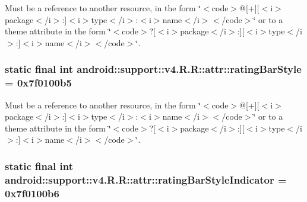 Must be a reference to another resource, in the form \char`\"{}$<$code$>$@\mbox{[}+\mbox{]}\mbox{[}$<$i$>$package$<$/i$>$:\mbox{]}$<$i$>$type$<$/i$>$:$<$i$>$name$<$/i$>$$<$/code$>$\char`\"{} or to a theme attribute in the form \char`\"{}$<$code$>$?\mbox{[}$<$i$>$package$<$/i$>$:\mbox{]}\mbox{[}$<$i$>$type$<$/i$>$:\mbox{]}$<$i$>$name$<$/i$>$$<$/code$>$\char`\"{}. \hypertarget{classandroid_1_1support_1_1v4_1_1_r_1_1attr_386384daeadc0061ae532dcde951e29c}{
\subsubsection[{ratingBarStyle}]{\setlength{\rightskip}{0pt plus 5cm}static final int android::support::v4.R.R::attr::ratingBarStyle = 0x7f0100b5}}
\label{classandroid_1_1support_1_1v4_1_1_r_1_1attr_386384daeadc0061ae532dcde951e29c}


Must be a reference to another resource, in the form \char`\"{}$<$code$>$@\mbox{[}+\mbox{]}\mbox{[}$<$i$>$package$<$/i$>$:\mbox{]}$<$i$>$type$<$/i$>$:$<$i$>$name$<$/i$>$$<$/code$>$\char`\"{} or to a theme attribute in the form \char`\"{}$<$code$>$?\mbox{[}$<$i$>$package$<$/i$>$:\mbox{]}\mbox{[}$<$i$>$type$<$/i$>$:\mbox{]}$<$i$>$name$<$/i$>$$<$/code$>$\char`\"{}. \hypertarget{classandroid_1_1support_1_1v4_1_1_r_1_1attr_3572bdeff819c4eed7b78bad9b83710c}{
\subsubsection[{ratingBarStyleIndicator}]{\setlength{\rightskip}{0pt plus 5cm}static final int android::support::v4.R.R::attr::ratingBarStyleIndicator = 0x7f0100b6}}
\label{classandroid_1_1support_1_1v4_1_1_r_1_1attr_3572bdeff819c4eed7b78bad9b83710c}


